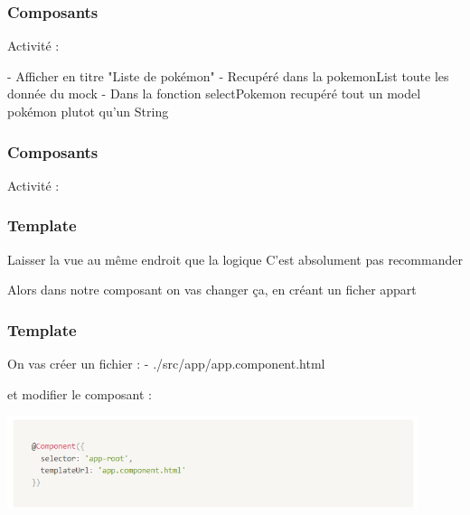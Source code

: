 \documentclass[10pt]{beamer}
\begin{document}
	\begin{frame}
		\frametitle{Composants}

		Activité : \newline \newline

		- Afficher en titre "Liste de pokémon" \newline
		- Recupéré dans la pokemonList toute les donnée du mock \newline
		- Dans la fonction selectPokemon recupéré tout un model pokémon plutot qu'un String \newline

	\end{frame}

	\begin{frame}
		\frametitle{Composants}

		Activité : \newline \newline


	\end{frame}

	\begin{frame}
		\frametitle{Template}

		Laisser la vue au même endroit que la logique \newline
		C'est absolument pas \alert{recommander} \newline \newline

		Alors dans notre composant on vas changer ça, \newline en créant un ficher appart\newline \newline

	\end{frame}

	\begin{frame}
		\frametitle{Template}

		On vas créer un fichier : \newline
		- ./src/app/app.component.html \newline \newline

		et modifier le composant : \newline


		\centering
		\includegraphics[width=12cm]{assets/templateAsset} \newline

	\end{frame}
\end{document}
